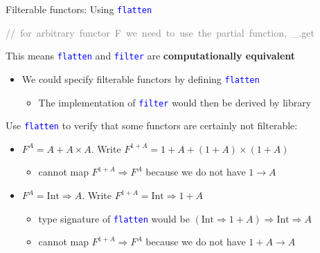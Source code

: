 \documentclass[english]{beamer}
\newenvironment{lyxcode}
   {\par\begin{list}{}{
     \setlength{\rightmargin}{\leftmargin}
     \setlength{\listparindent}{0pt}%
     \raggedright
     \setlength{\itemsep}{0pt}
     \setlength{\parsep}{0pt}
     \normalfont\ttfamily}%
    \def\{{\char`\{}
    \def\}{\char`\}}
    \def\textasciitilde{\char`\~}
    \item[]}
   {\end{list}}
\begin{document}
\begin{frame}{Filterable functors: Using \texttt{\textcolor{blue}{\footnotesize{}flatten}}}
\begin{itemize}
\begin{lyxcode}
\textrm{\textcolor{gray}{\footnotesize{}//~for~arbitrary~functor~}}\textcolor{gray}{\footnotesize{}F}\textrm{\textcolor{gray}{\footnotesize{}~we~need~to~use~the~partial~function,~}}\textcolor{gray}{\footnotesize{}\_.get}{\footnotesize \par}
\end{lyxcode}
\item This means \texttt{\textcolor{blue}{\footnotesize{}flatten}} and \texttt{\textcolor{blue}{\footnotesize{}filter}}
are \textbf{computationally equivalent}
\begin{itemize}
\item We could specify filterable functors by defining \texttt{\textcolor{blue}{\footnotesize{}flatten}} 
\begin{itemize}
\item The implementation of \texttt{\textcolor{blue}{\footnotesize{}filter}}
would then be derived by library
\end{itemize}
\end{itemize}
\item Use \texttt{\textcolor{blue}{\footnotesize{}flatten}} to verify that
some functors are certainly not filterable:
\begin{itemize}
\item $F^{A}=A+A\times A$. Write $F^{1+A}=1+A+(1+A)\times(1+A)$ 
\begin{itemize}
\item cannot map $F^{1+A}\Rightarrow F^{A}$ because we do not have $1\rightarrow A$
\end{itemize}
\item $F^{A}=\text{Int}\Rightarrow A$. Write $F^{1+A}=\text{Int}\Rightarrow1+A$ 
\begin{itemize}
\item type signature of \texttt{\textcolor{blue}{\footnotesize{}flatten}}
would be $\left(\text{Int}\Rightarrow1+A\right)\Rightarrow\text{Int}\Rightarrow A$
\item cannot map $F^{1+A}\Rightarrow F^{A}$ because we do not have $1+A\rightarrow A$
\end{itemize}
\end{itemize}
\end{itemize}
\end{frame}
\end{document}
